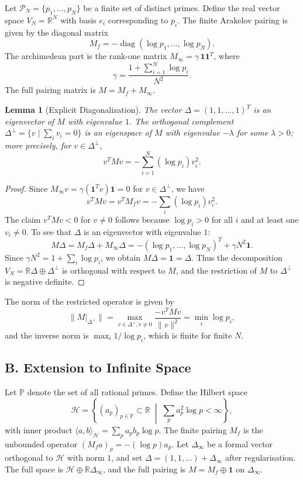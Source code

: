 \documentclass[11pt,a4paper]{article}
\newtheorem{lemma}[theorem]{Lemma}
\begin{document}
Let $\mathcal{P}_N = \{p_1,\dots,p_N\}$ be a finite set of distinct primes. Define the real vector space $V_N = \mathbb{R}^N$ with basis $e_i$ corresponding to $p_i$. The finite Arakelov pairing is given by the diagonal matrix
\[
M_f = -\operatorname{diag}(\log p_1,\dots,\log p_N).
\]
The archimedean part is the rank-one matrix $M_\infty = \gamma \, \mathbf{1}\mathbf{1}^T$, where
\[
\gamma = \frac{1 + \sum_{i=1}^N \log p_i}{N^2}.
\]
The full pairing matrix is $M = M_f + M_\infty$.

\begin{lemma}[Explicit Diagonalization]
The vector $\Delta = (1,1,\dots,1)^T$ is an eigenvector of $M$ with eigenvalue $1$. The orthogonal complement $\Delta^\perp = \{v \mid \sum_i v_i = 0\}$ is an eigenspace of $M$ with eigenvalue $-\lambda$ for some $\lambda>0$; more precisely, for $v \in \Delta^\perp$,
\[
v^T M v = -\sum_{i=1}^N (\log p_i) v_i^2.
\]
\end{lemma}

\begin{proof}
Since $M_\infty v = \gamma (\mathbf{1}^T v)\mathbf{1} = 0$ for $v \in \Delta^\perp$, we have
\[
v^T M v = v^T M_f v = -\sum_i (\log p_i) v_i^2.
\]
The claim $v^T M v < 0$ for $v \ne 0$ follows because $\log p_i > 0$ for all $i$ and at least one $v_i \ne 0$. To see that $\Delta$ is an eigenvector with eigenvalue $1$:
\[
M \Delta = M_f \Delta + M_\infty \Delta = -(\log p_1,\dots,\log p_N)^T + \gamma N^2 \mathbf{1}.
\]
Since $\gamma N^2 = 1 + \sum_i \log p_i$, we obtain $M \Delta = \mathbf{1} = \Delta$. Thus the decomposition $V_N = \mathbb{R}\Delta \oplus \Delta^\perp$ is orthogonal with respect to $M$, and the restriction of $M$ to $\Delta^\perp$ is negative definite.
\end{proof}

The norm of the restricted operator is given by
\[
\| M|_{\Delta^\perp} \| = \max_{v \in \Delta^\perp, v\ne 0} \frac{-v^T M v}{\|v\|^2} = \min_{i} \log p_i,
\]
and the inverse norm is $\max_{i} 1/\log p_i$, which is finite for finite $N$.

\subsection{B. Extension to Infinite Space}

Let $\mathbb{P}$ denote the set of all rational primes. Define the Hilbert space
\[
\mathcal{H} = \left\{ (a_p)_{p \in \mathbb{P}} \subset \mathbb{R} \;\middle|\; \sum_{p} a_p^2 \log p < \infty \right\},
\]
with inner product $\langle a,b \rangle_{\mathcal{H}} = \sum_p a_p b_p \log p$. The finite pairing $M_f$ is the unbounded operator $(M_f a)_p = -(\log p) a_p$. Let $\Delta_\infty$ be a formal vector orthogonal to $\mathcal{H}$ with norm $1$, and set $\Delta = (1,1,\dots) + \Delta_\infty$ after regularisation. The full space is $\mathcal{H} \oplus \mathbb{R}\Delta_\infty$, and the full pairing is $M = M_f \oplus \mathbf{1}$ on $\Delta_\infty$.
\end{document}
